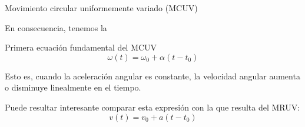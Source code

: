 \documentclass[11pt,handout,aspectratio=1610]{beamer}
\newcommand{\vs}{\vspace{11pt}}
\begin{document}
\begin{frame}{Movimiento circular uniformemente variado (MCUV)}

En consecuencia, tenemos la

\begin{block}{Primera ecuación fundamental del MCUV}
    $$\omega(t) = \omega_0 + \alpha \left(t - t_0\right)$$
\end{block} Esto es, cuando la aceleración angular es constante, la velocidad angular aumenta o disminuye linealmente en el tiempo.

\vs 

Puede resultar interesante comparar esta expresión con la que resulta del MRUV: $$v(t) = v_0 + a \left(t - t_0\right)$$

\end{frame}
\end{document}
